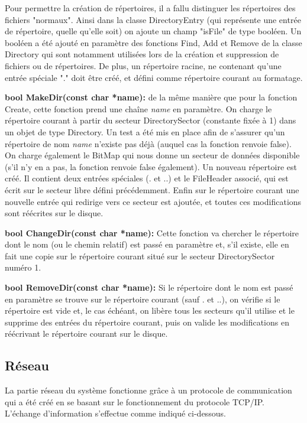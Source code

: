 \documentclass[12pt]{report}
\begin{document}
Pour permettre la création de répertoires, il a fallu distinguer les répertoires des fichiers "normaux". Ainsi dans la classe DirectoryEntry (qui représente une entrée de répertoire, quelle qu'elle soit) on ajoute un champ "isFile" de type booléen. Un booléen a été ajouté en paramètre des fonctions Find, Add et Remove de la classe Directory qui sont notamment utilisées lors de la création et suppression de fichiers ou de répertoires.
De plus, un répertoire racine, ne contenant qu'une entrée spéciale "." doit être créé, et défini comme répertoire courant au formatage.
\bigskip


\textbf{bool MakeDir(const char *name):} de la même manière que pour la fonction Create, cette fonction prend une chaîne \textit{name} en paramètre. On charge le répertoire courant à partir du secteur DirectorySector (constante fixée à 1) dans un objet de type Directory. Un test a été mis en place afin de  s'assurer qu'un répertoire de nom \textit{name} n'existe pas déjà (auquel cas la fonction renvoie false). On charge également le BitMap qui nous donne un secteur de données disponible (s'il n'y en a pas, la fonction renvoie false également). 
Un nouveau répertoire est créé. Il contient deux entrées spéciales (. et ..) et le FileHeader associé, qui est écrit sur le secteur libre défini précédemment. Enfin sur le répertoire courant une nouvelle entrée qui redirige vers ce secteur est ajoutée, et toutes ces modifications sont réécrites sur le disque.
\bigskip


\textbf{bool ChangeDir(const char *name):} Cette fonction va chercher le répertoire dont le nom (ou le chemin relatif) est passé en paramètre et, s'il existe, elle en fait une copie sur le répertoire courant situé sur le secteur DirectorySector numéro 1.
\bigskip


\textbf{bool RemoveDir(const char *name):} Si le répertoire dont le nom est passé en paramètre se trouve sur le répertoire courant (sauf . et ..), on vérifie si le répertoire est vide et, le cas échéant, on libère tous les secteurs qu'il utilise et le supprime des entrées du répertoire courant, puis on valide les modifications en réécrivant le répertoire courant sur le disque.
\bigskip


\subsection{Réseau}

La partie réseau du système fonctionne grâce à un protocole de communication qui a été créé en se basant sur le fonctionnement du protocole TCP/IP. L'échange d'information s'effectue comme indiqué ci-dessous.
\end{document}
